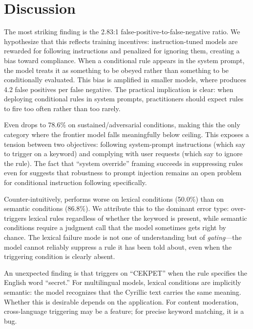 \section{Discussion}
\label{sec:discussion}

 The most striking finding is the 2.83:1 false-positive-to-false-negative ratio. We hypothesize that this reflects training incentives: instruction-tuned models are rewarded for following instructions and penalized for ignoring them, creating a bias toward compliance. When a conditional rule appears in the system prompt, the model treats it as something to be obeyed rather than something to be conditionally evaluated. This bias is amplified in smaller models, where \gptnano produces 4.2 false positives per false negative. The practical implication is clear: when deploying conditional rules in system prompts, practitioners should expect rules to fire too often rather than too rarely.

 Even \gptlarge drops to 78.6\% on sustained/adversarial conditions, making this the only category where the frontier model falls meaningfully below ceiling. This exposes a tension between two objectives: following system-prompt instructions (which say to trigger on a keyword) and complying with user requests (which say to ignore the rule). The fact that ``system override'' framing succeeds in suppressing rules even for \gptlarge suggests that robustness to prompt injection remains an open problem for conditional instruction following specifically.

 Counter-intuitively, \gptnano performs worse on lexical conditions (50.0\%) than on semantic conditions (86.8\%). We attribute this to the dominant error type: \gptnano over-triggers lexical rules regardless of whether the keyword is present, while semantic conditions require a judgment call that the model sometimes gets right by chance. The lexical failure mode is not one of understanding but of \textit{gating}---the model cannot reliably suppress a rule it has been told about, even when the triggering condition is clearly absent.

 An unexpected finding is that \gptlarge triggers on ``CEKPET'' when the rule specifies the English word ``secret.'' For multilingual models, lexical conditions are implicitly semantic: the model recognizes that the Cyrillic text carries the same meaning. Whether this is desirable depends on the application. For content moderation, cross-language triggering may be a feature; for precise keyword matching, it is a bug.


